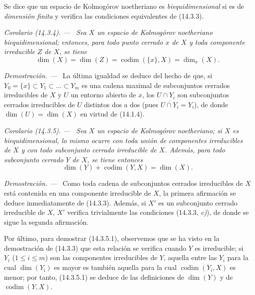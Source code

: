 \documentclass[10pt,oneside]{book}
\makeatletter
\newcommand{\setmanualcurrentlabel}[1]{\def\@currentlabel{#1}}
\newcommand{\oldpage}[2][]{%
  \setcounter{footnote}{0}%
  \marginpar{\scriptsize\textbf{#1}~|~#2}\ignorespaces}
\newenvironment{corollary}[1][]{%
  \setmanualcurrentlabel{#1}\par\medskip\noindent\itshape Corolario (#1). ---\ }{\par}
\newenvironment{proof}{%
  \par\medskip\noindent\textit{Demostración. ---\ }}{\par}
\makeatother
\begin{document}
Se dice que un espacio de Kolmogórov noetheriano es \emph{biequidimensional}
si es de \emph{dimensión finita} y verifica las condiciones equivalentes de
(14.3.3).

\begin{corollary}[14.3.4]
\label{0.14.3.4-es}
Sea $X$ un espacio de Kolmogórov noetheriano biequidimensional; entonces, para
todo punto cerrado $x$ de $X$ y toda componente irreducible $Z$ de $X$, se tiene
\[
  \dim(X)=\dim(Z)=\operatorname{codim}(\{x\},X)=\dim_x(X).
  \tag{14.3.4.1}\label{0.14.3.4.1-es}
\]
\end{corollary}

\oldpage[0\textsubscript{IV-1}]{12}
\begin{proof}
La última igualdad se deduce del hecho de que, si
$Y_0=\{x\}\subset Y_1\subset\ldots\subset Y_m$ es una cadena maximal de
subconjuntos cerrados irreducibles de $X$ y $U$ un entorno abierto de $x$, los
$U\cap Y_i$ son subconjuntos cerrados irreducibles de $U$ distintos dos a dos
(pues $\overline{U\cap Y_i}=Y_i$), de donde
$\dim(U)=\dim(X)$ en virtud de (14.1.4).
\end{proof}

\begin{corollary}[14.3.5]
\label{0.14.3.5-es}
Sea $X$ un espacio de Kolmogórov noetheriano; si $X$ es biequidimensional, lo
mismo ocurre con toda unión de componentes irreducibles de $X$ y con todo
subconjunto cerrado irreducible de $X$. Además, para todo subconjunto cerrado
$Y$ de $X$, se tiene entonces
\[
  \dim(Y)+\operatorname{codim}(Y,X)=\dim(X).
  \tag{14.3.5.1}\label{0.14.3.5.1-es}
\]
\end{corollary}

\begin{proof}
Como toda cadena de subconjuntos cerrados irreducibles de $X$ está contenida en
una componente irreducible de $X$, la primera afirmación se deduce
inmediatamente de (14.3.3). Además, si $X'$ es un subconjunto cerrado
irreducible de $X$, $X'$ verifica trivialmente las condiciones (14.3.3, \emph{c)}), de
donde se sigue la segunda afirmación.

Por último, para demostrar (14.3.5.1), observemos que se ha visto en la
demostración de (14.3.3) que esta relación se verifica cuando $Y$ es
irreducible; si $Y_i$ ($1\leq i\leq m$) son las componentes irreducibles de
$Y$, aquella entre las $Y_i$ para la cual $\dim(Y_i)$ es mayor es también
aquella para la cual $\operatorname{codim}(Y_i,X)$ es menor; por tanto,
(14.3.5.1) se deduce de las definiciones de $\dim(Y)$ y de
$\operatorname{codim}(Y,X)$.
\end{proof}
\end{document}
